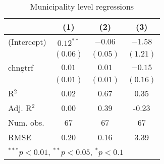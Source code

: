 
\begin{table}
\caption{Municipality level regressions}
\begin{center}
\begin{tabular}{l c c c }
\hline
 & (1) & (2) & (3) \\
\hline
(Intercept) & $0.12^{**}$ & $-0.06$  & $-1.58$  \\
            & $(0.06)$    & $(0.05)$ & $(1.21)$ \\
chngtrf     & $0.01$      & $0.01$   & $-0.15$  \\
            & $(0.01)$    & $(0.01)$ & $(0.16)$ \\
\hline
R$^2$       & 0.02        & 0.67     & 0.35     \\
Adj. R$^2$  & 0.00        & 0.39     & -0.23    \\
Num. obs.   & 67          & 67       & 67       \\
RMSE        & 0.20        & 0.16     & 3.39     \\
\hline
\multicolumn{4}{l}{\scriptsize{$^{***}p<0.01$, $^{**}p<0.05$, $^*p<0.1$}}
\end{tabular}
\label{table:coefficients}
\end{center}
\end{table}
